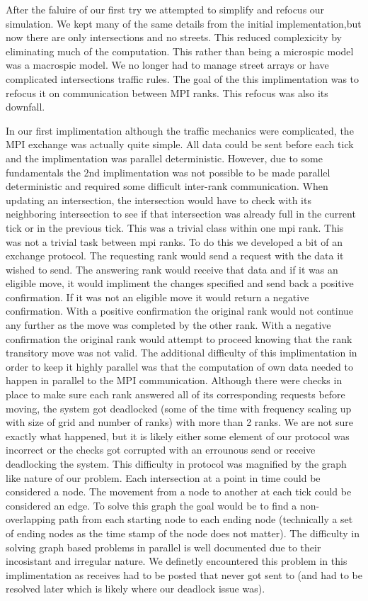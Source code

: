 \documentclass[10pt,a4paper]{article}
\begin{document}
After the faluire of our first try we attempted to simplify and refocus our simulation. We kept many of the same details from the initial implementation,but now there are only intersections and no streets. This reduced complexicity by eliminating much of the computation. This rather than being a microspic model was a macrospic model. We no longer had to manage street arrays or have complicated intersections traffic rules. The goal of the this implimentation was to refocus it on communication between MPI ranks. This refocus was also its downfall. 

In our first implimentation although the traffic mechanics were complicated, the MPI exchange was actually quite simple. All data could be sent before each tick and the implimentation was parallel deterministic. However, due to some fundamentals the 2nd implimentation was not possible to be made parallel deterministic and required some difficult inter-rank communication. When updating an intersection, the intersection would have to check with its neighboring intersection to see if that intersection was already full in the current tick or in the previous tick. This was a trivial class within one mpi rank. This was not a trivial task between mpi ranks. To do this we developed a bit of an exchange protocol. The requesting rank would send a request with the data it wished to send. The answering rank would receive that data and if it was an eligible move, it would impliment the changes specified and send back a positive confirmation. If it was not an eligible move it would return a negative confirmation. With a positive confirmation the original rank would not continue any further as the move was completed by the other rank. With a negative confirmation the original rank would attempt to proceed knowing that the rank transitory move was not valid.
The additional difficulty of this implimentation in order to keep it highly parallel was that the computation of own data needed to happen in parallel to the MPI communication. Although there
were checks in place to make sure each rank answered all of its corresponding requests before moving,
the system got deadlocked (some of the time with frequency scaling up with size of grid and number of ranks) with more than 2 ranks. We are not sure exactly what happened, but it is likely either some element of our protocol was incorrect or the checks got corrupted with an errounous send or receive
deadlocking the system.
This difficulty in protocol was magnified by the graph like nature of our problem. Each intersection at a point in time could be considered a node. The movement from a node to another at each tick could be considered an edge. To solve this graph the goal would be to find a non-overlapping path from each starting node to each ending node (technically a set of ending nodes as the time stamp of the node does not matter). The difficulty in solving graph based problems in parallel is well documented due to their incosistant and irregular nature. We definetly encountered this problem in this implimentation as receives had to be posted that never got sent to (and had to be resolved later which is likely where our deadlock issue was).
\end{document}
